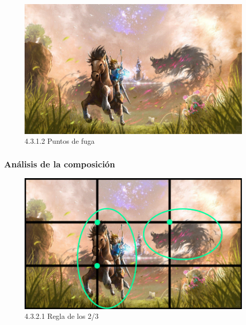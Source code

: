 \documentclass[12pt]{article}
\begin{document}
    \begin{figure}[H]
      \centering
      \includegraphics[scale=0.7]{images/Saúl/Sección 17/EA_img17_1Perspectiva_2PuntosFuga.png}
      \caption{\small 4.3.1.2 Puntos de fuga}
    \end{figure}




        \subsubsection{Análisis de la composición}

        
    \begin{figure}[H]
      \centering
      \includegraphics[scale=0.7]{images/Saúl/Sección 17/EA_img17_2Composicion_1Regla2-3.png}
      \caption{\small 4.3.2.1 Regla de los 2/3}
    \end{figure}
\end{document}
